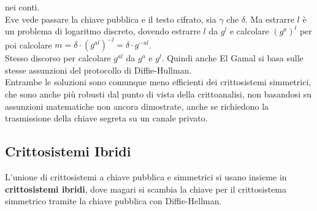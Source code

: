 \documentclass[a4paper,12pt, oneside]{book}
\begin{document}
nei conti.\\ 
Eve vede passare la chiave pubblica e il testo cifrato, sia $\gamma$ che
$\delta$. Ma estrarre $l$ è un problema di logaritmo discreto, dovendo estrarre
$l$ da $g^l$ e calcolare $(g^a)^l$ per poi calcolare $m=\delta\cdot
(g^{al})^{-l}=\delta\cdot g^{-al}$.\\
Stesso discorso per calcolare $g^{al}$ da $g^a$ e $g^l$. Quindi anche El Gamal
si basa sulle stesse assunzioni del protocollo di Diffie-Hullman.\\
Entrambe le soluzioni sono comunque meno efficienti dei crittosistemi
simmetrici, che sono anche più robusti dal punto di vista della crittoanalisi,
non basandosi su assunzioni matematiche non ancora dimostrate,
anche se richiedono la trasmissione della chiave segreta su un canale privato.
\subsection{Crittosistemi Ibridi}
L'unione di crittosistemi a chiave pubblica e simmetrici si usano insieme in
\textbf{crittosistemi ibridi}, dove magari si scambia la chiave per il
crittosistema simmetrico tramite la chiave pubblica con Diffie-Hellman.
\end{document}

